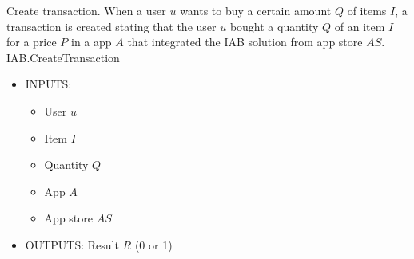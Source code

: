 \noindent \textsf{Create transaction}. When a user $u$ wants to buy a certain amount $Q$ of items $I$, a transaction is created stating that the user $u$ bought a quantity $Q$ of an item $I$ for a price $P$ in a app $A$ that integrated the IAB solution from app store $AS$. \\

\textsf{IAB.CreateTransaction}
\begin{itemize}
	\item INPUTS:
	\begin{itemize}
		\item User $u$
		\item Item $I$
		\item Quantity $Q$
		\item App $A$
		\item App store $AS$
	\end{itemize}
	\item OUTPUTS: Result $R$ (0 or 1)
\end{itemize}

